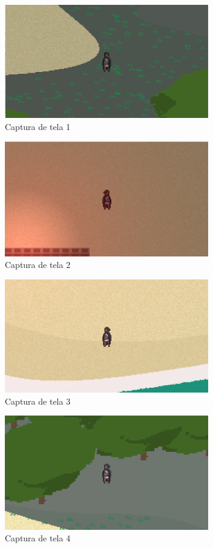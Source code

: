 \documentclass[12pt, 
openright, 
oneside, 
a4paper,    
brazil]{facom-ufu-abntex2}
\begin{document}
\begin{figure}[H]
	\centering
	\includegraphics[width=24em]{imagens/ss1.png}
	\caption{Captura de tela 1}
\end{figure}

\begin{figure}[H]
	\centering
	\includegraphics[width=24em]{imagens/ss2.png}
	\caption{Captura de tela 2}
\end{figure}
\begin{figure}[H]
	\centering
	\includegraphics[width=24em]{imagens/ss3.png}
	\caption{Captura de tela 3}
\end{figure}
\begin{figure}[H]
	\centering
	\includegraphics[width=24em]{imagens/ss4.png}
	\caption{Captura de tela 4}
\end{figure}
\end{document}
